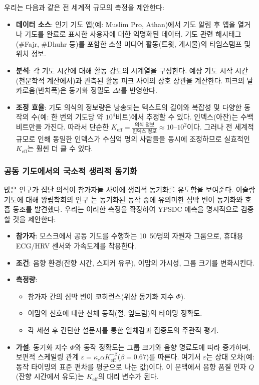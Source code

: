 \documentclass[12pt,a4paper]{article}
\newcommand{\Keff}{K_{\mathrm{eff}}}
\begin{document}
	우리는 다음과 같은 전 세계적 규모의 측정을 제안한다:
	\begin{itemize}
		\item \textbf{데이터 소스}: 인기 기도 앱(예: Muslim Pro, Athan)에서 기도 알림 후 앱을 열거나 기도를 완료로 표시한 사용자에 대한 익명화된 데이터. 기도 관련 해시태그(\#Fajr, \#Dhuhr 등)를 포함한 소셜 미디어 활동(트윗, 게시물)의 타임스탬프 및 위치 정보.
		\item \textbf{분석}: 각 기도 시간에 대해 활동 강도의 시계열을 구성한다. 예상 기도 시작 시간(천문학적 계산에서)과 관측된 활동 피크 사이의 상호 상관을 계산한다. 피크의 날카로움(반치폭)은 동기화 정밀도 $\Delta t$를 반영한다.
		\item \textbf{조정 효율}: 기도 의식의 정보량은 낭송되는 텍스트의 길이와 복잡성 및 다양한 동작의 수(예: 한 번의 기도당 약 $10^4$비트)에서 추정할 수 있다. 인덱스(아잔)는 수백 비트만을 가진다. 따라서 단순한 $\Keff = \frac{\text{의식 정보}}{\text{인덱스 정보}} \approx 10$–$10^2$이다. 그러나 전 세계적 규모로 인해 동일한 인덱스가 수십억 명의 사람들을 동시에 조정하므로 실효적인 $\Keff$는 훨씬 더 클 수 있다.
	\end{itemize}
	
	\subsubsection{공동 기도에서의 국소적 생리적 동기화}
	많은 연구가 집단 의식이 참가자들 사이에 생리적 동기화를 유도함을 보여준다. 이슬람 기도에 대해 왕립학회의 연구 \cite{RoyalSociety2024}는 동기화된 동작 중에 유의미한 심박 변이 동기화와 호흡 동조를 발견했다. 우리는 이러한 측정을 확장하여 YPSDC 예측을 명시적으로 검증할 것을 제안한다:
	\begin{itemize}
		\item \textbf{참가자}: 모스크에서 공동 기도를 수행하는 10~50명의 자원자 그룹으로, 휴대용 ECG/HRV 센서와 가속도계를 착용한다.
		\item \textbf{조건}: 음향 환경(잔향 시간, 스피커 유무), 이맘의 가시성, 그룹 크기를 변화시킨다.
		\item \textbf{측정량}:
		\begin{itemize}
			\item 참가자 간의 심박 변이 코히런스(위상 동기화 지수 $\Phi$).
			\item 이맘의 신호에 대한 신체 동작(절, 엎드림)의 타이밍 정확도.
			\item 각 세션 후 간단한 설문지를 통한 일체감과 집중도의 주관적 평가.
		\end{itemize}
		\item \textbf{가설}: 동기화 지수 $\Phi$와 동작 정확도는 그룹 크기와 음향 명료도에 따라 증가하며, 보편적 스케일링 관계 $\varepsilon = \kappa_c \alpha \Keff^{-\beta}$($\beta=0.67$)를 따른다. 여기서 $\varepsilon$는 상대 오차(예: 동작 타이밍의 표준 편차를 평균으로 나눈 값)이다. 이 문맥에서 음향 품질 인자 $Q$(잔향 시간에서 유도)는 $\Keff$의 대리 변수가 된다.
	\end{itemize}
	
\end{document}
